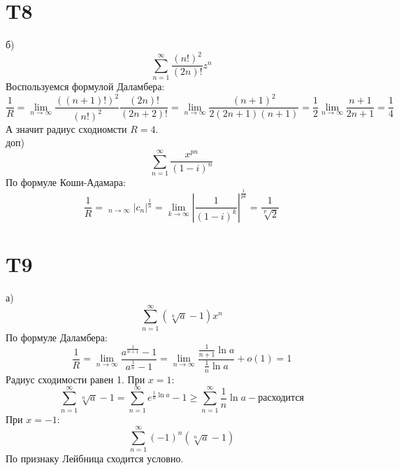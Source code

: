 \documentclass[12pt]{article}
\DeclareMathOperator*\uplim{\overline{lim}}
\begin{document}
\section{T8}
б)
\[
    \sum_{n=1}^{\infty} \frac{(n!)^2}{(2n)!} z^n 
\]
Воспользуемся формулой Даламбера:
\[
    \frac{1}{R} = \lim_{n \to \infty} \frac{\left( (n+1)! \right)^2 }{(n!)^2} \frac{(2n)!}{(2n + 2)!} = 
    \lim_{n \to \infty} \frac{(n + 1)^2}{2(2n + 1)(n+1)} = \frac{1}{2} \lim_{n \to \infty} \frac{n+1}{2n+1} = \frac{1}{4} 
\]
А значит радиус сходиомсти $R = 4$.
\\ доп)
\[
    \sum_{n=1}^{\infty} \frac{x^{pn}}{(1 - i)^n}
\]
По формуле Коши-Адамара: 
\[
    \frac{1}{R} = \uplim_{n \to \infty} \vert c_n \vert^{\frac{1}{n}} = \lim_{k \to \infty} \left\vert \frac{1}{(1 - i)^k} \right\vert^{\frac{1}{pk}} = 
    \frac{1}{\sqrt[p]{2}}
\]
\section{T9}
а) 
\[
    \sum_{n=1}^{\infty} (\sqrt[n]{a} - 1) x^n
\]
По формуле Даламбера: 
\[
    \frac{1}{R} = \lim_{n \to \infty} \frac{a^{\frac{1}{n+1}} - 1}{a^{\frac{1}{n}} - 1} = 
    \lim_{n \to \infty} \frac{\frac{1}{n+1} \ln a}{\frac{1}{n} \ln a} + o(1) = 1
\]
Радиус сходимости равен 1. 
При $x = 1$:
\[
    \sum_{n=1}^{\infty} \sqrt[n]{a} - 1 = \sum_{n=1}^{\infty} e^{\frac{1}{n} \ln a} - 1 \geq \sum_{n=1}^{\infty} \frac{1}{n} \ln a - \text{расходится}
\] 
При $x = -1$:
\[
    \sum_{n=1}^{\infty} (-1)^n \left( \sqrt[n]{a} - 1 \right) 
\] 
По признаку Лейбница сходится условно.
\end{document}

